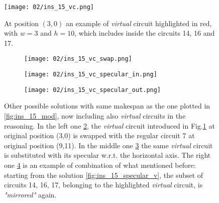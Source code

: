         \begin{figure}[H]
            \centering
            \texttt{[image: 02/ins\_15\_vc.png]}
            \caption{
                At position $(3,0)$ an example of \textit{virtual} circuit highlighted in red,
                with $w = 3$ and $h = 10$, which includes inside the circuits 14, 16 and 17.
            }
            \label{fig:virtual circuit}
        \end{figure}

        \begin{figure}[H]
            \centering
            \begin{subfigure}[b]{0.3\textwidth}
                \centering 
                \texttt{[image: 02/ins\_15\_vc\_swap.png]}
                \caption{}
                \label{fig:vc_swap}
            \end{subfigure}
            \hfill
            \begin{subfigure}[b]{0.3\textwidth}
                \centering
                \texttt{[image: 02/ins\_15\_vc\_specular\_in.png]}
                \caption{}
                \label{fig:vc_specular_in}
            \end{subfigure}
            \hfill
            \begin{subfigure}[b]{0.3\textwidth}
                \centering
                \texttt{[image: 02/ins\_15\_vc\_specular\_out.png]}
                \caption{}
                \label{fig:vc_specular_out}
            \end{subfigure}
            \caption{
                Other possible solutions with same makespan as the one plotted in \ref{fig:ins_15_mod},
                now including also \textit{virtual} circuits in the reasoning.
                In the left one \ref{fig:vc_swap}, the \textit{virtual} circuit introduced in Fig.\ref{fig:virtual circuit}
                at original position (3,0) is swapped with the regular circuit 7 at original position (9,11).
                In the middle one \ref{fig:vc_specular_in} the same \textit{virtual} circuit is substituted with 
                its specular w.r.t. the horizontal axis.
                The right one \ref{fig:vc_specular_out} is an example of combination of what mentioned before:
                starting from the solution \ref{fig:ins_15_specular_v}, the subset of circuits 14, 16, 17, belonging to 
                the highlighted \textit{virtual} circuit, is \textit{"mirrored"} again.
            }
            \label{fig:symmetry_vc}
        \end{figure}

